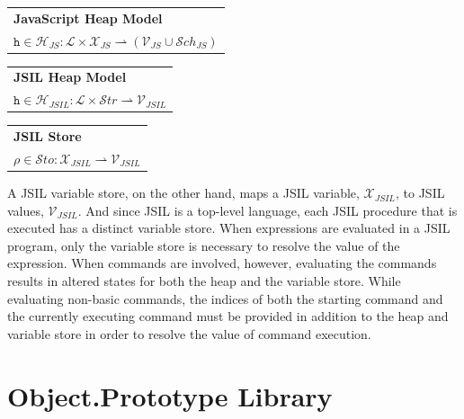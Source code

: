 \documentclass[a4paper,11pt,twoside]{report}
\begin{document}
\begin{center}
\begin{tabular}{p{8cm}} \hline
\textbf{JavaScript Heap Model} \\
$\texttt{h} \in \mathcal{H}_{JS} : \mathcal{L} \times \mathcal{X}_{JS} \rightharpoonup (\mathcal{V}_{JS} \cup \mathcal{S}ch_{JS})$  \\ \hline
\end{tabular}

\vspace{0.3cm}
\begin{tabular}{p{8cm}} \hline
\textbf{JSIL Heap Model} \\
$\texttt{h} \in \mathcal{H}_{JSIL} : \mathcal{L} \times \mathcal{S}tr \rightharpoonup \mathcal{V}_{JSIL}  $  \\ \hline
\end{tabular}

\vspace{0.3cm}
\begin{tabular}{p{8cm}} \hline
\textbf{JSIL Store} \\
$\rho \in \mathcal{S}to : \mathcal{X}_{JSIL} \rightharpoonup \mathcal{V}_{JSIL}  $  \\ \hline
\end{tabular}
\end{center}

A JSIL variable store, on the other hand, maps a JSIL variable, $\mathcal{X}_{JSIL}$, to JSIL values, $\mathcal{V}_{JSIL}$. And since JSIL is a top-level language, each JSIL procedure that is executed has a distinct variable store. When expressions are evaluated in a JSIL program, only the variable store is necessary to resolve the value of the expression. When commands are involved, however, evaluating the commands results in altered states for both the heap and the variable store. While evaluating non-basic commands, the indices of both the starting command and the currently executing command must be provided in addition to the heap and variable store in order to resolve the value of command execution.

\chapter{Object.Prototype Library}
\end{document}
